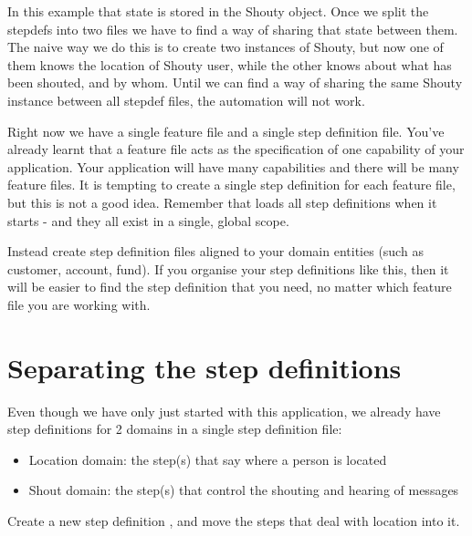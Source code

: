     
    In this example that state is stored in the Shouty object. Once we split the stepdefs into two files we have to find a way of sharing that state between them. The naive way we do this is to create two instances of Shouty, but now one of them knows the location of Shouty user, while the other knows about what has been shouted, and by whom. Until we can find a way of sharing the same Shouty instance between all stepdef files, the automation will not work.
\fi 

\ifcontent 
    Right now we have a single feature file and a single step definition file. You've already learnt that a feature file acts as the specification of one capability of your application. Your application will have many capabilities and there will be many feature files. It is tempting to create a single step definition for each feature file, but this is not a good idea. Remember that \CUKE{} loads all step definitions when it starts - and they all exist in a single, global scope.
    
    Instead create step definition files aligned to your domain entities (such as customer, account, fund). If you organise your step definitions like this, then it will be easier to find the step definition that you need, no matter which feature file you are working with.
    
    
    \section*{Separating the step definitions}
    
    Even though we have only just started with this application, we already have step definitions for 2 domains in a single step definition file:
    \begin{itemize}    
        \item Location domain: the step(s) that say where a person is located
        \item Shout domain: the step(s) that control the shouting and hearing of messages
    \end{itemize}
    
    Create a new step definition
    , 
    and move the steps that deal with location into it. 
    
    
\fi